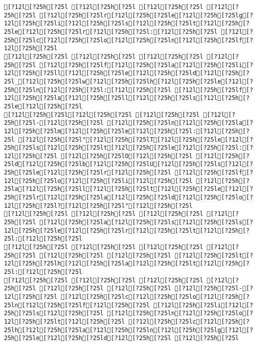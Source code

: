 \documentclass{scrartcl}
\begin{document}
\begin{Verbatim}
[?12l[?25h[?25l [?12l[?25h[?25l [?12l[?25h[?25l [?12l[?25h[?25l [?12l[?25h[?25lr[?12l[?25h[?25le[?12l[?25h[?25lg[?12l[?25h[?25li[?12l[?25h[?25ls[?12l[?25h[?25lt[?12l[?25h[?25le[?12l[?25h[?25lr[?12l[?25h[?25l:[?12l[?25h[?25l [?12l[?25h[?25lc[?12l[?25h[?25lo[?12l[?25h[?25ln[?12l[?25h[?25lf[?12l[?25h[?25l
[?12l[?25h[?25l [?12l[?25h[?25l [?12l[?25h[?25l [?12l[?25h[?25l [?12l[?25h[?25lf[?12l[?25h[?25la[?12l[?25h[?25li[?12l[?25h[?25ll[?12l[?25h[?25le[?12l[?25h[?25ld[?12l[?25h[?25l_[?12l[?25h[?25lw[?12l[?25h[?25lh[?12l[?25h[?25le[?12l[?25h[?25ln[?12l[?25h[?25l:[?12l[?25h[?25l [?12l[?25h[?25lf[?12l[?25h[?25la[?12l[?25h[?25ll[?12l[?25h[?25ls[?12l[?25h[?25le[?12l[?25h[?25l
[?12l[?25h[?25l[?12l[?25h[?25l [?12l[?25h[?25l [?12l[?25h[?25l-[?12l[?25h[?25l [?12l[?25h[?25ln[?12l[?25h[?25la[?12l[?25h[?25lm[?12l[?25h[?25le[?12l[?25h[?25l:[?12l[?25h[?25l [?12l[?25h[?25l"[?12l[?25h[?25lT[?12l[?25h[?25le[?12l[?25h[?25ls[?12l[?25h[?25lt[?12l[?25h[?25le[?12l[?25h[?25l:[?12l[?25h[?25l [?12l[?25h[?25lO[?12l[?25h[?25l [?12l[?25h[?25ld[?12l[?25h[?25lb[?12l[?25h[?25lU[?12l[?25h[?25ls[?12l[?25h[?25le[?12l[?25h[?25lr[?12l[?25h[?25l [?12l[?25h[?25lf[?12l[?25h[?25lo[?12l[?25h[?25li[?12l[?25h[?25l [?12l[?25h[?25la[?12l[?25h[?25ll[?12l[?25h[?25lt[?12l[?25h[?25le[?12l[?25h[?25lr[?12l[?25h[?25la[?12l[?25h[?25ld[?12l[?25h[?25lo[?12l[?25h[?25l?[?12l[?25h[?25l"[?12l[?25h[?25l
[?12l[?25h[?25l [?12l[?25h[?25l [?12l[?25h[?25l [?12l[?25h[?25l [?12l[?25h[?25la[?12l[?25h[?25ls[?12l[?25h[?25ls[?12l[?25h[?25le[?12l[?25h[?25lr[?12l[?25h[?25lt[?12l[?25h[?25l:[?12l[?25h[?25l
[?12l[?25h[?25l [?12l[?25h[?25l [?12l[?25h[?25l [?12l[?25h[?25l [?12l[?25h[?25l [?12l[?25h[?25l [?12l[?25h[?25lt[?12l[?25h[?25lh[?12l[?25h[?25la[?12l[?25h[?25lt[?12l[?25h[?25l:[?12l[?25h[?25l
[?12l[?25h[?25l [?12l[?25h[?25l [?12l[?25h[?25l [?12l[?25h[?25l [?12l[?25h[?25l [?12l[?25h[?25l [?12l[?25h[?25l-[?12l[?25h[?25l [?12l[?25h[?25lc[?12l[?25h[?25lo[?12l[?25h[?25ln[?12l[?25h[?25lf[?12l[?25h[?25l [?12l[?25h[?25li[?12l[?25h[?25ls[?12l[?25h[?25l [?12l[?25h[?25ln[?12l[?25h[?25lo[?12l[?25h[?25lt[?12l[?25h[?25l [?12l[?25h[?25lc[?12l[?25h[?25lh[?12l[?25h[?25la[?12l[?25h[?25ln[?12l[?25h[?25lg[?12l[?25h[?25le[?12l[?25h[?25ld[?12l[?25h[?25l [?12l[?25h[?25l

\end{Verbatim}
\end{document}
